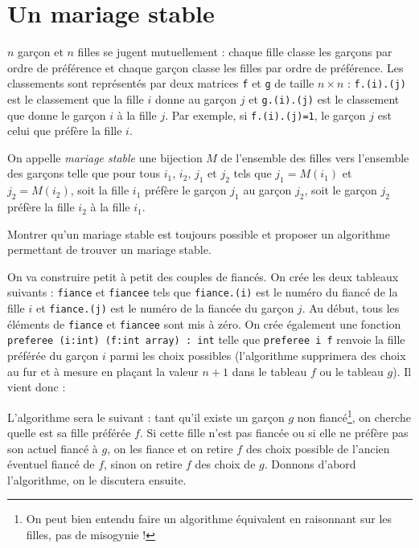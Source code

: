 \renewcommand{\SourceFile}{5-graphes/src/5-3.ml}

\section{Un mariage stable}

$n$ garçon et $n$ filles se jugent mutuellement : chaque fille classe les garçons par ordre de préférence et chaque garçon classe les filles par ordre de préférence. Les classements sont représentés par deux matrices \texttt{f} et \texttt{g} de taille $n \times n$ : \texttt{f.(i).(j)} est le classement que la fille $i$ donne au garçon $j$ et \texttt{g.(i).(j)} est le classement que donne le garçon $i$ à la fille $j$. Par exemple, si \texttt{f.(i).(j)=1}, le garçon $j$ est celui que préfère la fille $i$.
\medskip

On appelle \textit{mariage stable} une bijection $M$ de l'ensemble des filles vers l'ensemble des garçons telle que pour tous $i_1$, $i_2$, $j_1$ et $j_2$ tels que $j_1 = M(i_1)$ et $j_2 = M(i_2)$, soit la fille $i_1$ préfère le garçon $j_1$ au garçon $j_2$, soit le garçon $j_2$ préfère la fille $i_2$ à la fille $i_1$.

\Q
Montrer qu'un mariage stable est toujours possible et proposer un algorithme permettant de trouver un mariage stable.

\Corrige

\Q
On va construire petit à petit des couples de fiancés. On crée les deux tableaux suivants : \texttt{fiance} et \texttt{fiancee} tels que \texttt{fiance.(i)} est le numéro du fiancé de la fille $i$ et \texttt{fiance.(j)} est le numéro de la fiancée du garçon $j$. Au début, tous les éléments de \texttt{fiance} et \texttt{fiancee} sont mis à zéro. On crée également une fonction \texttt{preferee (i:int) (f:int array) : int} telle que \texttt{preferee i f} renvoie la fille préférée du garçon $i$ parmi les choix possibles (l'algorithme supprimera des choix au fur et à mesure en plaçant la valeur $n+1$ dans le tableau $f$ ou le tableau $g$). Il vient donc :



L'algorithme sera le suivant : tant qu'il existe un garçon $g$ non fiancé\footnote{On peut bien entendu faire un algorithme équivalent en raisonnant sur les filles, pas de misogynie !}, on cherche quelle est sa fille préférée $f$. Si cette fille n'est pas fiancée ou si elle ne préfère pas son actuel fiancé à $g$, on les fiance et on retire $f$ des choix possible de l'ancien éventuel fiancé de $f$, sinon on retire $f$ des choix de $g$. Donnons d'abord l'algorithme, on le discutera ensuite.

